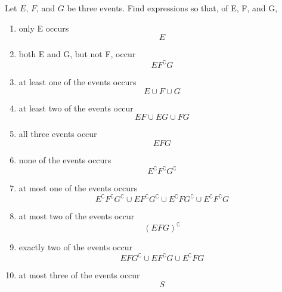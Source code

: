 \item Let $E$, $F$, and $G$ be three events. Find expressions so that, of E, F, and G,
\begin{enumerate}
     \item only E occurs
     \[ E \]
     \item both E and G, but not F, occur
     \[ EF^\complement G \]
     \item at least one of the events occurs
     \[ E\cup F\cup G \]
     \item at least two of the events occur
     \[ EF\cup EG\cup FG \]
     \item all three events occur
     \[ EFG \]
     \item none of the events occurs
     \[ E^\complement F^\complement G^\complement  \]
     \item at most one of the events occurs
     \[ E^\complement F^\complement G^\complement \cup EF^\complement G^\complement \cup E^\complement FG^\complement \cup E^\complement F^\complement G \]
     \item at most two of the events occur
     \[ (EFG)^\complement  \]
     \item exactly two of the events occur
     \[ EFG^\complement \cup EF^\complement G\cup E^\complement FG \]
     \item at most three of the events occur
     \[ S \]
\end{enumerate}
